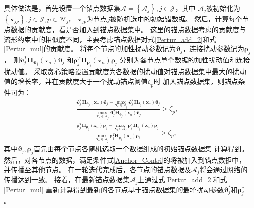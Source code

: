 具体做法是，首先设置一个锚点数据集$\mathcal{A}=\left\{\mathcal{A}_j\right\},j\in\mathcal{J}$，{其中
$\mathcal{A}_j$被初始化为$\left\{\boldsymbol x_{jp}\right\},j\in\mathcal{J},p\in\mathcal{N}_j$，
$\boldsymbol x_{jp}$为节点$j$被随机选中的初始锚数据。}
然后，计算每个节点数据的贡献度，看是否加入到锚点数据集中。
这里的锚点数据考虑的贡献度与流形约束中的相似度不同，主要考虑锚点数据对式\eqref{Pertur_add_2}和式\eqref{Pertur_mul}的贡献度。
将每个节点的加性扰动参数记为$\boldsymbol \vartheta_j $，连接扰动参数记为$\boldsymbol \rho_j$，
则${\boldsymbol \vartheta}_j^T\boldsymbol H_{\boldsymbol\vartheta_j}\left(\boldsymbol x_n\right)\boldsymbol \vartheta_j$
和${\boldsymbol \rho}_j^T\boldsymbol H_{\boldsymbol \rho_j}\left(\boldsymbol x_n\right)\boldsymbol \rho_j$
分别为各节点单个数据的加性扰动值和连接扰动值。
采取贪心策略设置贡献度为各数据的扰动值对锚点数据集中最大的扰动值的增长率，并在贡献度大于一个扰动锚点阈值$\zeta_p$时
加入锚点数据集，则锚点条件可为：
\begin{equation}
    \label{Anchor_Contri}
    \begin{split}
        \frac{{\boldsymbol \vartheta}_j^T\boldsymbol H_{\boldsymbol\vartheta_j}\left(\boldsymbol x_n\right)
        \boldsymbol \vartheta_j - \max_{\boldsymbol x_a\in \mathcal{A}_j}
        {\boldsymbol \vartheta}_j^T\boldsymbol H_{\boldsymbol\vartheta_j}\left(\boldsymbol x_a\right)
        \boldsymbol \vartheta_j} {\max_{\boldsymbol x_a\in \mathcal{A}_j}
        {\boldsymbol \vartheta}_j^T\boldsymbol H_{\boldsymbol\vartheta_j}\left(\boldsymbol x_a\right)
        \boldsymbol \vartheta_j}
        > \zeta_p,\\
        \frac{{\boldsymbol \rho}_j^T\boldsymbol H_{\boldsymbol \rho_j}\left(\boldsymbol x_n\right)
        \boldsymbol \rho_j - \max_{\boldsymbol x_a\in \mathcal{A}_j}
        {\boldsymbol \rho}_j^T\boldsymbol H_{\boldsymbol \rho_j}\left(\boldsymbol x_a\right)
        \boldsymbol \rho_j} {\max_{\boldsymbol x_a\in \mathcal{A}_j}
        {\boldsymbol \rho}_j^T\boldsymbol H_{\boldsymbol \rho_j}\left(\boldsymbol x_a\right)
        \boldsymbol \rho_j} 
        > \zeta_p,
    \end{split}
\end{equation}
其中$\boldsymbol \vartheta_j,\boldsymbol \rho_j$首先由每个节点各随机选取一个数据组成的初始锚点数据集
计算得到。
然后，对各节点的数据，满足条件式\eqref{Anchor_Contri}的将被加入到锚点数据中，并传播至其他节点。
在一轮迭代完成后，各节点的锚点数据及$\mathcal{A}_j$将会通过网络的传播达到一致。
接着，在最新锚点数据集$\mathcal{A}_j$上通过式\eqref{Pertur_add_2}和式\eqref{Pertur_mul}
重新计算得到最新的各节点基于锚点数据集的最坏扰动参数$\boldsymbol \vartheta_j^* $和$\boldsymbol \rho_j^*$。


